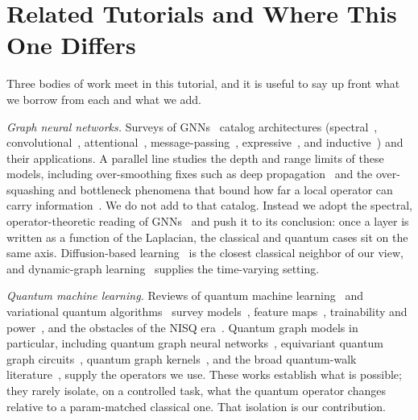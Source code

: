 \section{Related Tutorials and Where This One Differs}
\label{sec:related}

Three bodies of work meet in this tutorial, and it is useful to say up front what we
borrow from each and what we add.

\textit{Graph neural networks.} Surveys of GNNs~\cite{wu2021gnnsurvey} catalog
architectures (spectral~\cite{bruna2014spectral,defferrard2016chebnet},
convolutional~\cite{kipf2017gcn}, attentional~\cite{velickovic2018gat},
message-passing~\cite{gilmer2017mpnn}, expressive~\cite{xu2019gin}, and
inductive~\cite{hamilton2017graphsage}) and their applications. A parallel line studies
the depth and range limits of these models, including over-smoothing fixes such as
deep propagation~\cite{chen2020gcnii,gasteiger2019appnp} and the over-squashing and
bottleneck phenomena that bound how far a local operator can carry
information~\cite{alon2021bottleneck,topping2022oversquashing}. We do not add to that
catalog. Instead we adopt the spectral, operator-theoretic reading of
GNNs~\cite{shuman2013gsp} and push it to its conclusion: once a layer is written as a
function of the Laplacian, the classical and quantum cases sit on the same axis.
Diffusion-based learning~\cite{gasteiger2019diffusion} is the closest classical neighbor
of our view, and dynamic-graph learning~\cite{rossi2020tgn,kazemi2020dynamicsurvey}
supplies the time-varying setting.

\textit{Quantum machine learning.} Reviews of quantum machine
learning~\cite{biamonte2017qml,dunjko2018review} and variational quantum
algorithms~\cite{cerezo2021vqa} survey models~\cite{schuld2014quest}, feature
maps~\cite{schuld2019featurespace,havlicek2019supervised}, trainability and
power~\cite{abbas2021power}, and the obstacles of the NISQ
era~\cite{preskill2018nisq,mcclean2018barren}. Quantum graph models in particular,
including quantum graph neural networks~\cite{verdon2019qgnn}, equivariant quantum graph
circuits~\cite{mernyei2022equivariant}, quantum graph
kernels~\cite{henry2021quantumkernel}, and the broad quantum-walk
literature~\cite{farhi1998quantumwalk,kempe2003qwalk,childs2003exponential,childs2004quantumwalk,childs2009universal,venegas2012quantumwalks,portugal2013book},
supply the operators we use. These works establish what is possible; they rarely
isolate, on a controlled task, what the quantum operator changes relative to a
param-matched classical one. That isolation is our contribution.

